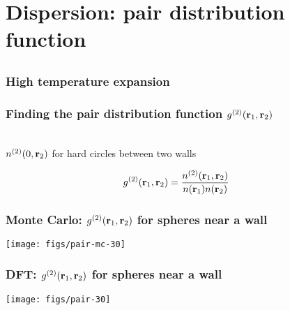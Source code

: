 
\section{Dispersion: pair distribution function}

\subsection{}

\begin{frame}
  \frametitle{High temperature expansion}
\end{frame}

\begin{frame}
  \frametitle{Finding the pair distribution function $g^{(2)}(\mathbf{r}_1,\mathbf{r}_2)$}
  \vspace{-0.8em}
  \begin{center}
    \\
    \vspace{-4.0em}
    $n^{(2)}(0,\mathbf{r}_2)$ for hard circles between two walls
  \end{center}
  \begin{align*}
    g^{(2)}(\mathbf{r}_1,\mathbf{r}_2) &= \frac{n^{(2)}(\mathbf{r}_1,\mathbf{r}_2)}{n(\mathbf{r}_1)n(\mathbf{r}_2)}
  \end{align*}
\end{frame}

\begin{frame}
  \frametitle{Monte Carlo: $g^{(2)}(\mathbf{r}_1,\mathbf{r}_2)$ for spheres near a wall}
  \texttt{[image: figs/pair-mc-30]}
\end{frame}

\begin{frame}
  \frametitle{DFT: $g^{(2)}(\mathbf{r}_1,\mathbf{r}_2)$ for spheres near a wall}
  \texttt{[image: figs/pair-30]}
\end{frame}

